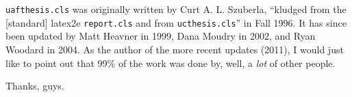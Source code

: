 \texttt{uafthesis.cls} was originally written by Curt A. L. Szuberla, ``kludged from the [standard] latex2e \texttt{report.cls} and from \texttt{ucthesis.cls}''
in Fall 1996. It has since been updated by Matt Heavner in 1999, Dana Moudry in
2002, and Ryan Woodard in 2004. As the author of the more recent updates (2011),
I would just like to point out that 99\% of the work was done by, well, a
\emph{lot} of other people.

Thanks, guys.
